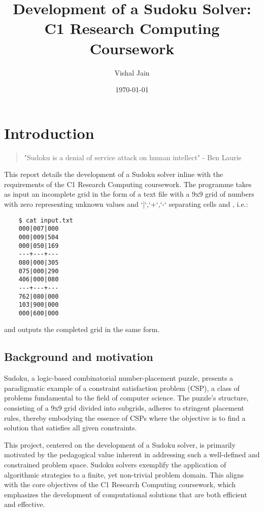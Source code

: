 \documentclass[11pt]{article}
\title{Development of a Sudoku Solver: C1 Research Computing Coursework}
\author{Vishal Jain}
\date{\today}
\begin{document}
\maketitle

\tableofcontents
\newpage

\section{Introduction}

\begin{quote}
    "Sudoku is a denial of service attack on human
  intellect" - Ben Laurie
\end{quote}

This report details the development of a Sudoku solver inline with the requirements of the C1 Research Computing coursework. The programme takes as input an incomplete grid in the form of a text file with a 9x9 grid of numbers with zero representing unknown values and `|`,`+`,`-` separating cells and , i.e.:


\begin{verbatim}
    $ cat input.txt
    000|007|000
    000|009|504
    000|050|169
    ---+---+---
    080|000|305
    075|000|290
    406|000|080
    ---+---+---
    762|080|000
    103|900|000
    000|600|000
    \end{verbatim}

and outputs the completed grid in the same form.

\subsection{Background and motivation}

Sudoku, a logic-based combinatorial number-placement puzzle, presents a paradigmatic example of a constraint satisfaction problem (CSP), a class of problems fundamental to the field of computer science. The puzzle's structure, consisting of a 9x9 grid divided into subgrids, adheres to stringent placement rules, thereby embodying the essence of CSPs where the objective is to find a solution that satisfies all given constraints.

This project, centered on the development of a Sudoku solver, is primarily motivated by the pedagogical value inherent in addressing such a well-defined and constrained problem space. Sudoku solvers exemplify the application of algorithmic strategies to a finite, yet non-trivial problem domain. This aligns with the core objectives of the C1 Research Computing coursework, which emphasizes the development of computational solutions that are both efficient and effective.
\end{document}
